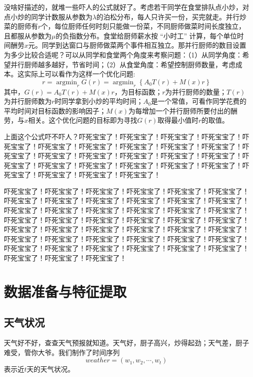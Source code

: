 \documentclass[a4paper,12pt]{book} %
\begin{document}
没啥好描述的，就堆一些吓人的公式就好了。考虑若干同学在食堂排队点小炒，对点小炒的同学计数服从参数为$\lambda$的泊松分布，每人只许买一份，买完就走。并行炒菜的厨师有$r$个，每位厨师任何时刻只能做一份菜，不同厨师做菜时间长度独立，且都服从参数为$\mu$的负指数分布。食堂给厨师薪水按 “小时工” 计算，每个单位时间酬劳$x$元。同学到达窗口与厨师做菜两个事件相互独立。那并行厨师的数目设置为多少比较合适呢？可以从同学和食堂两个角度来考察问题：（1）从同学角度：希望并行厨师越多越好，节省时间；（2）从食堂角度：希望控制厨师数量，考虑成本。这实际上可以看作为这样一个优化问题:
$$r = \mathop{\arg\min}_{r} G(r) = \mathop{\arg\min}_{r} \left\{ A_0 T(r) + M(x) r \right\}$$
其中，$G(r) = A_0 T(r) + M(x)r$，为目标函数；$r$为并行厨师的数量；$T(r)$为并行厨师数为$r$时同学拿到小炒的平均时间；$A_0$是一个常值，可看作同学花费的平均时间对目标函数的影响因子；$M(x)$为每增加一个并行厨师所要付出的酬劳，与$x$相关。这个优化问题的目标即为寻找$G(r)$取得最小值时$r$的取值。

上面这个公式吓不吓人？吓死宝宝了！吓死宝宝了！吓死宝宝了！吓死宝宝了！吓死宝宝了！吓死宝宝了！吓死宝宝了！吓死宝宝了！吓死宝宝了！吓死宝宝了！吓死宝宝了！吓死宝宝了！吓死宝宝了！吓死宝宝了！吓死宝宝了！吓死宝宝了！吓死宝宝了！吓死宝宝了！吓死宝宝了！吓死宝宝了！吓死宝宝了！吓死宝宝了！吓死宝宝了！吓死宝宝了！吓死宝宝了！吓死宝宝了！

吓死宝宝了！吓死宝宝了！吓死宝宝了！吓死宝宝了！吓死宝宝了！吓死宝宝了！吓死宝宝了！吓死宝宝了！吓死宝宝了！吓死宝宝了！吓死宝宝了！吓死宝宝了！吓死宝宝了！吓死宝宝了！吓死宝宝了！吓死宝宝了！吓死宝宝了！吓死宝宝了！吓死宝宝了！吓死宝宝了！吓死宝宝了！吓死宝宝了！吓死宝宝了！吓死宝宝了！吓死宝宝了！吓死宝宝了！吓死宝宝了！吓死宝宝了！吓死宝宝了！吓死宝宝了！吓死宝宝了！吓死宝宝了！吓死宝宝了！吓死宝宝了！吓死宝宝了！吓死宝宝了！吓死宝宝了！吓死宝宝了！吓死宝宝了！吓死宝宝了！吓死宝宝了！吓死宝宝了！吓死宝宝了！吓死宝宝了！吓死宝宝了！

\section{数据准备与特征提取}

\subsection{天气状况}
天气好不好，查查天气预报就知道。天气好，厨子高兴，炒得起劲；天气差，厨子难受，管你大爷。我们制作了时间序列
$$weather = (w_1, w_2, \cdots, w_t)$$
表示近$t$天的天气状况。
\end{document}
